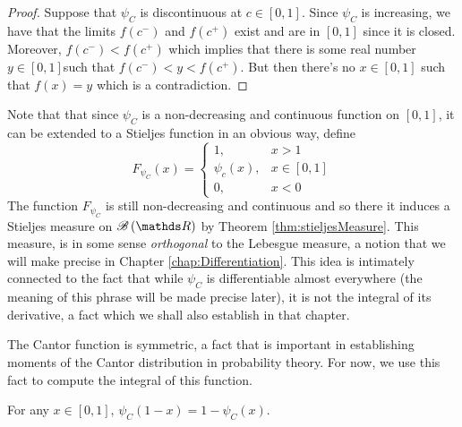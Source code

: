 \begin{proof}
Suppose that $\psi_{C}$ is discontinuous at $c\in\left[0,1\right]$.
Since $\psi_{C}$ is increasing, we have that the limits $f\left(c^{-}\right)$
and $f\left(c^{+}\right)$ exist and are in $\left[0,1\right]$ since
it is closed. Moreover, $f\left(c^{-}\right)<f\left(c^{+}\right)$
which implies that there is some real number $y\in\left[0,1\right]$such
that $f\left(c^{-}\right)<y<f\left(c^{+}\right).$ But then there's
no $x\in\left[0,1\right]$ such that $f\left(x\right)=y$ which is
a contradiction.
\end{proof}
Note that that since $\psi_{C}$ is a non-decreasing and continuous
function on $\left[0,1\right]$, it can be extended to a Stieljes
function in an obvious way, define 
\[
F_{\psi_{C}}\left(x\right)=\begin{cases}
1, & x>1\\
\psi_{c}\left(x\right), & x\in\left[0,1\right]\\
0, & x<0
\end{cases}
\]
The function $F_{\psi_{C}}$ is still non-decreasing and continuous
and so there it induces a Stieljes measure on $\borel\left(\R\right)$
by Theorem \ref{thm:stieljesMeasure}. This measure, is in some sense
\emph{orthogonal }to the Lebesgue measure, a notion that we will make
precise in Chapter \ref{chap:Differentiation}. This idea is intimately
connected to the fact that while $\psi_{C}$ is differentiable almost
everywhere (the meaning of this phrase will be made precise later),
it is not the integral of its derivative, a fact which we shall also
establish in that chapter.

The Cantor function is symmetric, a fact that is important in establishing
moments of the Cantor distribution in probability theory. For now,
we use this fact to compute the integral of this function.
\begin{prop}
\label{prop:cantorFunctionSymmetry}For any $x\in\left[0,1\right]$,
$\psi_{C}\left(1-x\right)=1-\psi_{C}\left(x\right)$.
\end{prop}

